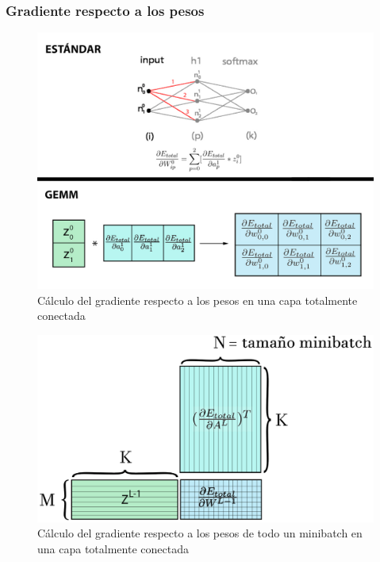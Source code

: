 \subsubsection{Gradiente respecto a los pesos}
\begin{figure}[H]
	\centering
	\includegraphics[scale=0.25]{imagenes/gemm_fully_back_w.jpg}  
	\caption{Cálculo del gradiente respecto a los pesos en una capa totalmente conectada}
	\label{fig:gemm_fully_back_w}
\end{figure}


\begin{figure}[H]
	\centering
	\includegraphics[scale=0.25]{imagenes/gemm_fully_back_w_minibatch.jpg}  
	\caption{Cálculo del gradiente respecto a los pesos de todo un minibatch en una capa totalmente conectada}
	\label{fig:gemm_fully_back_w_minibatch}
\end{figure}

